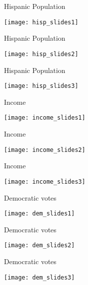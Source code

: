 \documentclass[xcolor=pdftex,dvipsnames,table]{beamer}
\begin{document}
\begin{frame}{Hispanic Population}
\begin{center}
\texttt{[image: hisp\_slides1]}
\end{center}
\end{frame}

\begin{frame}{Hispanic Population}
\begin{center}
\texttt{[image: hisp\_slides2]}
\end{center}
\end{frame}

\begin{frame}{Hispanic Population}
\begin{center}
\texttt{[image: hisp\_slides3]}
\end{center}
\end{frame}

\begin{frame}{Income}
\begin{center}
\texttt{[image: income\_slides1]}
\end{center}
\end{frame}

\begin{frame}{Income}
\begin{center}
\texttt{[image: income\_slides2]}
\end{center}
\end{frame}

\begin{frame}{Income}
\begin{center}
\texttt{[image: income\_slides3]}
\end{center}
\end{frame}

\begin{frame}{Democratic votes}
\begin{center}
\texttt{[image: dem\_slides1]}
\end{center}
\end{frame}

\begin{frame}{Democratic votes}
\begin{center}
\texttt{[image: dem\_slides2]}
\end{center}
\end{frame}

\begin{frame}{Democratic votes}
\begin{center}
\texttt{[image: dem\_slides3]}
\end{center}
\end{frame}
\end{document}

